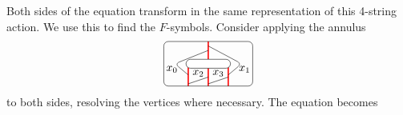 Both sides of the equation transform in the same representation of this 4-string action. We use this to find the $F$-symbols. Consider applying the annulus
\begin{equation}
\begin{tikzpicture}[scale=0.7,baseline=(current bounding box.center)]
\draw[red,line width=0.4mm](-.9,0)--(-.9,-1);
\draw[red,line width=0.4mm](0,0)--(0,-1);\draw[red,line width=0.4mm](0,.2)--(0,1);
\draw[red,line width=0.4mm](.9,0)--(.9,-1);
\draw[rounded corners] (0,.6)--(-1.5,0)--(-.9,-.5)node[pos=.5,left]{$x_0$};
\draw[rounded corners] (0,.8)--(1.5,0)--(.9,-.5)node[pos=.5,right]{$x_1$};
\draw[rounded corners] (-.9,-.9)--(0,-.6)node[pos=.5,above]{$x_2$};
\draw[rounded corners] (0,-.9)--(.9,-.6)node[pos=.5,above]{$x_3$};
\draw[rounded corners] (-2,-1) rectangle (2,1);
\filldraw[fill=white,rounded corners] (-1,-.2) rectangle (1,.2);
\end{tikzpicture}\label{eqn:Ftransform}
\end{equation}
to both sides, resolving the vertices where necessary. The equation becomes

